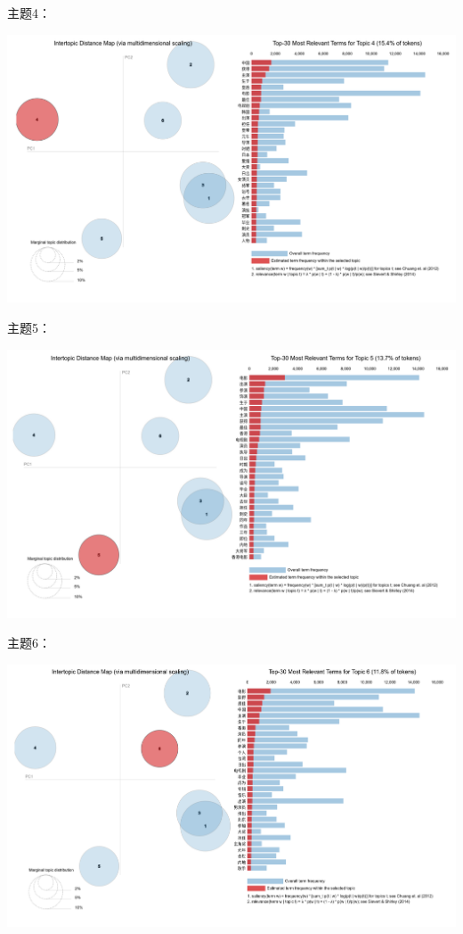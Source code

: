 \documentclass{article} [NO-DEFAULT-PACKAGES] \usepackage{wx672hyperref}
\begin{document}
主题4：

\begin{center}
\includegraphics[width=1.0\linewidth]{./static/topic-vis-04.png}
\end{center}  

主题5：

\begin{center}
\includegraphics[width=1.0\linewidth]{./static/topic-vis-05.png}
\end{center}  

主题6：

\begin{center}
\includegraphics[width=1.0\linewidth]{./static/topic-vis-06.png}
\end{center}  
\end{document}

